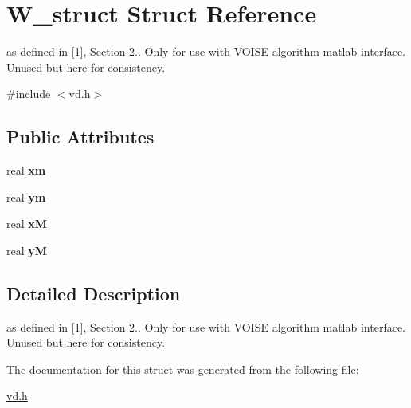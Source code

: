 \hypertarget{structW__struct}{}\section{W\+\_\+struct Struct Reference}
\label{structW__struct}


as defined in \mbox{[}1\mbox{]}, Section 2.. Only for use with V\+O\+I\+SE algorithm matlab interface. Unused but here for consistency.  




{\ttfamily \#include $<$vd.\+h$>$}

\subsection*{Public Attributes}
\begin{DoxyCompactItemize}
\item 
\mbox{\label{structW__struct_a7c0ed763a5701a0787361a68cad4aec4}} 
real {\bfseries xm}
\item 
\mbox{\label{structW__struct_a69290893bf3fc1a9bf0ff987a9e25320}} 
real {\bfseries ym}
\item 
\mbox{\label{structW__struct_a20e12df215aaa6a737a15b05e6102093}} 
real {\bfseries xM}
\item 
\mbox{\label{structW__struct_a10de004bf31c6563ad0a55116a96cd8d}} 
real {\bfseries yM}
\end{DoxyCompactItemize}


\subsection{Detailed Description}
as defined in \mbox{[}1\mbox{]}, Section 2.. Only for use with V\+O\+I\+SE algorithm matlab interface. Unused but here for consistency. 

The documentation for this struct was generated from the following file\+:\begin{DoxyCompactItemize}
\item 
\mbox{\hyperlink{vd_8h}{vd.\+h}}\end{DoxyCompactItemize}
